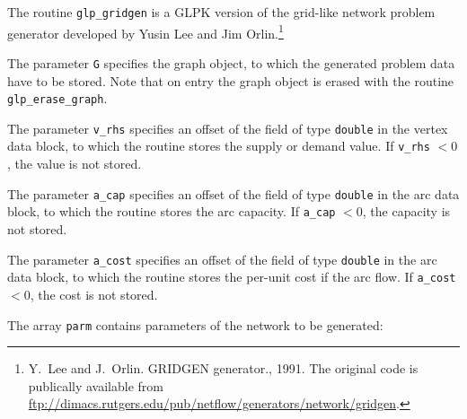 \documentclass[11pt]{report}
\def\para#1{\noindent{\bf#1}}
\def\description{\para{Description}}
\begin{document}
\description

The routine \verb|glp_gridgen| is a GLPK version of the grid-like
network problem generator developed by Yusin Lee and Jim
Orlin.\footnote{Y.~Lee and J.~Orlin. GRIDGEN generator., 1991. The
original code is publically available from
\url{ftp://dimacs.rutgers.edu/pub/netflow/generators/network/gridgen}.}

\newpage

The parameter \verb|G| specifies the graph object, to which the
generated  problem data have to be stored. Note that on entry the graph
object  is erased with the routine \verb|glp_erase_graph|.

The parameter \verb|v_rhs| specifies an offset of the field of type
\verb|double| in the vertex data block, to which the routine stores the
supply or  demand value. If \verb|v_rhs| $<0$, the value is not stored.

The parameter \verb|a_cap| specifies an offset of the field of type
\verb|double| in the arc data block, to which the routine stores the
arc capacity. If \verb|a_cap| $<0$, the capacity is not stored.

The parameter \verb|a_cost| specifies an offset of the field of type
\verb|double| in the arc data block, to which the routine stores the
per-unit cost if the arc flow. If \verb|a_cost| $<0$, the cost is not
stored.

The array \verb|parm| contains parameters of the network to be
generated:
\end{document}
